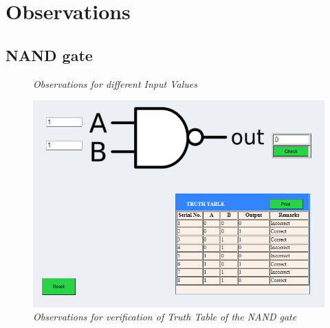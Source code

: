 \section{Observations}
	\subsection{NAND gate}
			\begin{figure}[ht]
				\centering 
				\hfill
				\caption{\textit{Observations for different Input Values}}
			\end{figure}
			\begin{figure}[h]
				\centering
				\includegraphics[width=0.85\linewidth]{img/exp2/fig9}
				\caption{\textit{Observations for verification of Truth Table of the NAND gate}}
				\label{fig:nand_obs_2}
			\end{figure}


